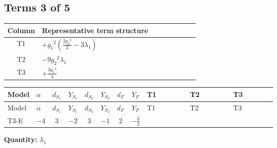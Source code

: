 \documentclass[8pt]{article}
\begin{document}
\begin{landscape}
\subsection*{Terms 3 of 5}
\begin{center}
\begin{tabular}{@{}c >{\raggedright\arraybackslash}p{0.82\linewidth}@{}}
\toprule
Column & Representative term structure \\
\midrule
T1 & \(\displaystyle +{g_1}^2 \left(\frac{3 {g_2}^2}{2}-3 {\lambda_1}\right)\) \\
\midrule
T2 & \(\displaystyle -9 {g_2}^2 {\lambda_1}\) \\
\midrule
T3 & \(\displaystyle +\frac{3 {g_1}^4}{4}\) \\
\midrule
\bottomrule
\end{tabular}
\end{center}
\smallskip
\tiny
\begin{longtable}{@{}llcccccc >{\raggedright\arraybackslash}p{0.21\linewidth} >{\raggedright\arraybackslash}p{0.21\linewidth} >{\raggedright\arraybackslash}p{0.21\linewidth}@{}}
\toprule
Model & $\alpha$ & $d_{S_1}$ & $Y_{S_1}$ & $d_{S_2}$ & $Y_{S_2}$ & $d_F$ & $Y_F$ & T1 & T2 & T3 \\
\midrule
\endfirsthead
\toprule
Model & $\alpha$ & $d_{S_1}$ & $Y_{S_1}$ & $d_{S_2}$ & $Y_{S_2}$ & $d_F$ & $Y_F$ & T1 & T2 & T3 \\
\midrule
\endhead
T3-E & $-4$ & $3$ & $-2$ & $3$ & $-1$ & $2$ & $-\frac{3}{2}$ & \scriptsize\adjustbox{max width=\linewidth}{$\begin{gathered} +{g_1}^2 \left(\frac{3 {g_2}^2}{2}-3 {\lambda_1}\right)\end{gathered}$} & \scriptsize\adjustbox{max width=\linewidth}{$\begin{gathered} -9 {g_2}^2 {\lambda_1}\end{gathered}$} & \scriptsize\adjustbox{max width=\linewidth}{$\begin{gathered} +\frac{3 {g_1}^4}{4}\end{gathered}$} \\
\midrule
\bottomrule
\end{longtable}
\clearpage
\noindent\textbf{Quantity: }$\lambda_1$\par\smallskip

\end{landscape}
\end{document}
